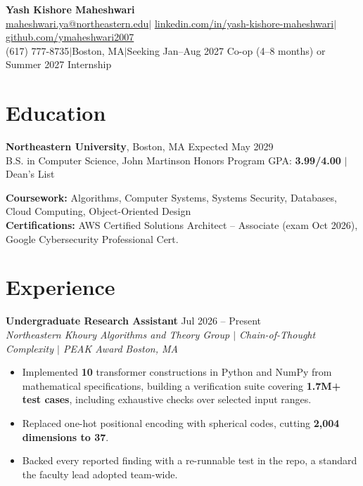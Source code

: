 \documentclass[letterpaper,10pt]{article}
\let\hrefplain\href
\renewcommand{\href}[2]{\hrefplain{#1}{\uline{#2}}}
\newcommand{\entrysize}{\fontsize{10.5}{12}\selectfont}
\newif\ifentrygap
\newcommand{\entrygapsize}{6pt}
\newcommand{\entryfirstgap}{0.4pt}
\newcommand{\entrysep}{\ifentrygap\vspace{\entrygapsize}\else\vspace{\entryfirstgap}\fi\global\entrygaptrue}
\let\entryorigsection\section
\renewcommand{\section}{\global\entrygapfalse\entryorigsection}
\newcommand{\entry}[4]{\entrysep{\entrysize\textbf{#1}} \hfill #2 \\ \textit{#3} \hfill \textit{#4}}
\newcommand{\hsep}{\hspace{0.2222em minus 0.1em}$\vert$\hspace{0.2222em minus 0.1em}}
\begin{document}
\begin{center}
  {\fontsize{18}{20}\selectfont\bfseries Yash Kishore Maheshwari}\\[3pt]
  \href{mailto:maheshwari.ya@northeastern.edu}{maheshwari.ya@northeastern.edu}\hsep%
  \href{https://linkedin.com/in/yash-kishore-maheshwari}{linkedin.com/in/yash-kishore-maheshwari}\hsep%
  \href{https://github.com/ymaheshwari2007}{github.com/ymaheshwari2007}\\
  (617) 777-8735\hsep Boston, MA\hsep Seeking Jan--Aug 2027 Co-op (4--8 months) or Summer 2027 Internship
\end{center}

\section{Education}

\textbf{Northeastern University}, Boston, MA \hfill Expected May 2029 \\
B.S. in Computer Science, John Martinson Honors Program \hfill
GPA: \textbf{3.99/4.00} $\vert$ Dean's List

\vspace{1pt}
\textbf{Coursework:} Algorithms, Computer Systems, Systems Security, Databases, Cloud Computing, Object-Oriented Design \\
{\fontsize{9.5}{11}\selectfont\textbf{Certifications:} AWS Certified Solutions Architect -- Associate (exam Oct 2026), Google Cybersecurity Professional Cert.}

\section{Experience}

\entry{Undergraduate Research Assistant}{Jul 2026 -- Present}
      {Northeastern Khoury Algorithms and Theory Group $\vert$ Chain-of-Thought Complexity $\vert$ PEAK Award}{Boston, MA}
\begin{itemize}
  \item Implemented \textbf{10} transformer constructions in Python and NumPy from mathematical specifications, building a
        verification suite covering \textbf{1.7M+ test cases}, including exhaustive checks over selected input ranges.
  \item Replaced one-hot positional encoding with spherical codes, cutting \textbf{2,004 dimensions to 37}.
  \item Backed every reported finding with a re-runnable test in the repo, a standard the faculty lead adopted team-wide.
\end{itemize}
\end{document}
